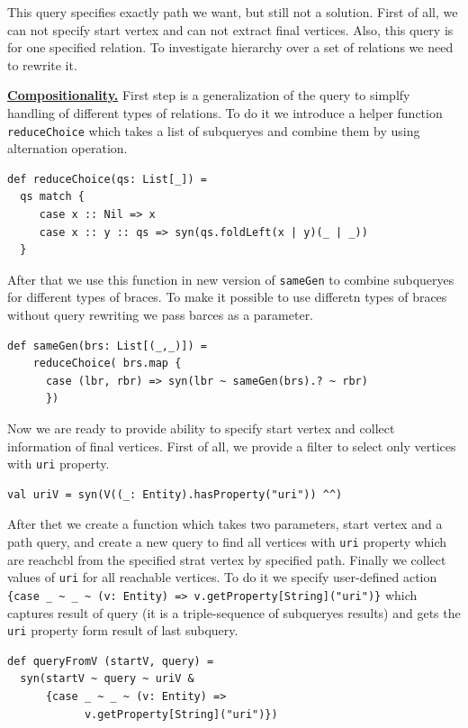 This query specifies exactly path we want, but still not a solution.
First of all, we can not specify start vertex and can not extract final vertices.
Also, this query is for one specified relation.
To investigate hierarchy over a set of relations we need to rewrite it.

\underline{\textbf{Compositionality.}}
First step is a generalization of the query to simplfy handling of different types of relations.
To do it we introduce a helper function \verb|reduceChoice| which takes a list of subqueryes and combine them by using alternation operation.

\begin{lstlisting}
def reduceChoice(qs: List[_]) =
  qs match {
     case x :: Nil => x
     case x :: y :: qs => syn(qs.foldLeft(x | y)(_ | _))
  }
\end{lstlisting}

After that we use this function in new version of \verb|sameGen| to combine subqueryes for different types of braces.
To make it possible to use differetn types of braces without query rewriting we pass barces as a parameter.

\begin{lstlisting}
def sameGen(brs: List[(_,_)]) =
    reduceChoice( brs.map {
      case (lbr, rbr) => syn(lbr ~ sameGen(brs).? ~ rbr)
      })
\end{lstlisting}

Now we are ready to provide ability to specify start vertex and collect information of final vertices.
First of all, we provide a filter to select only vertices with \verb|uri| property.

\begin{lstlisting}
val uriV = syn(V((_: Entity).hasProperty("uri")) ^^)
\end{lstlisting}

After thet we create a function which takes two parameters, start vertex and a path query, and create a new query to find all vertices with \verb|uri| property which are reachcbl from the specified strat vertex by specified path.
Finally we collect values of \verb|uri| for all reachable vertices.
To do it we specify user-defined action {\small \verb|{case _ ~ _ ~ (v: Entity) => v.getProperty[String]("uri")}|} which captures result of query (it is a triple-sequence of subqueryes results) and gets the \verb|uri| property form result of last subquery.

\begin{lstlisting}
def queryFromV (startV, query) =
  syn(startV ~ query ~ uriV &
      {case _ ~ _ ~ (v: Entity) =>
            v.getProperty[String]("uri")})
\end{lstlisting}


